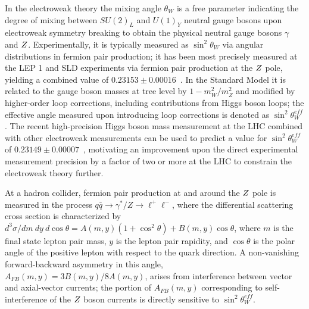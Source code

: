 
In the electroweak theory the mixing angle $\theta_W$ is a free
parameter indicating the degree of mixing between $SU(2)_L$ and
$U(1)_Y$ neutral gauge bosons upon electroweak symmetry breaking to
obtain the physical neutral gauge bosons $\gamma$ and $Z$.
Experimentally, it is typically measured as $\sin^2\theta_W$ via
angular distributions in fermion pair production; it has been most
precisely measured at the LEP 1 and SLD experiments via fermion pair
production at the $Z$ pole, yielding a combined value of
$0.23153\pm0.00016$~\cite{ALEPH:2005ab}. In the Standard Model it is
related to the gauge boson masses at tree level by $1-m_W^2/m_Z^2$ and
modified by higher-order loop corrections, including contributions
from Higgs boson loops; the effective angle measured upon introducing
loop corrections is denoted as $\sin^2\theta^{eff}_{W}$. The recent
high-precision Higgs boson mass measurement at the LHC combined with
other electroweak measurements can be used to predict a value for
$\sin^2\theta^{eff}_{W}$ of $0.23149 \pm 0.00007$~\cite{Baak:2014ora},
motivating an improvement upon the direct experimental measurement
precision by a factor of two or more at the LHC to constrain the
electroweak theory further.

At a hadron collider, fermion pair production at and around the $Z$
pole is measured in the process
$q\bar{q}\rightarrow \gamma^*/Z \rightarrow \ell^+\ell^-$, where the
differential scattering cross section is characterized by
$d^3\sigma/dm \ dy \ d\cos\theta = A(m,y)(1+\cos^2\theta) +
B(m,y)\cos\theta$, where $m$ is the final state lepton pair mass, $y$
is the lepton pair rapidity, and $\cos\theta$ is the polar angle of
the positive lepton with respect to the quark direction. A
non-vanishing forward-backward asymmetry in this angle, $A_{FB}(m,y) =
3B(m,y)/8A(m,y)$, arises from interference between vector and
axial-vector currents; the portion of $A_{FB}(m,y)$ corresponding to
self-interference of the $Z$ boson currents is directly sensitive to
$\sin^2\theta^{eff}_{W}$.

